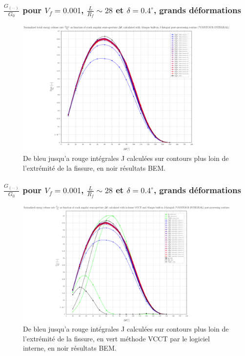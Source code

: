 \documentclass[first,firstsupp,lastsupp,handout,last,hyperref,table]{ETHclass}
\begin{document}
\begin{frame}
\frametitle{\small $\frac{G_{\left(\cdot\cdot\right)}}{G_{0}}$ pour $V_{f}=0.001$, $\frac{L}{R_{f}}\sim28$ et $\delta=0.4^{\circ}$, grands d\'eformations}
\vspace{-0.5cm}
\centering
\captionsetup[figure]{font=scriptsize,labelfont=scriptsize}
\begin{figure}[!h]
\centering
\includegraphics[height=0.7\textheight]{2017-06-23_AbqRunSummary_SingleFiberEqRfFiniteStrain_J-INT_Summary.pdf}
  \caption{\scriptsize De bleu jusqu'a rouge int\'egrales J calcul\'ees sur contours plus loin de l'extr\'emit\'e de la fissure, en noir r\'esultats BEM.}
  \label{fig:res1}
\end{figure}
\end{frame}

\begin{frame}
\frametitle{\small $\frac{G_{\left(\cdot\cdot\right)}}{G_{0}}$ pour $V_{f}=0.001$, $\frac{L}{R_{f}}\sim28$ et $\delta=0.4^{\circ}$, grands d\'eformations}
\vspace{-0.5cm}
\centering
\captionsetup[figure]{font=scriptsize,labelfont=scriptsize}
\begin{figure}[!h]
\centering
\includegraphics[height=0.7\textheight]{2017-06-23_AbqRunSummary_SingleFiberEqRfFiniteStrain_VCCT-JINT_Summary.pdf}
  \caption{\scriptsize De bleu jusqu'a rouge int\'egrales J calcul\'ees sur contours plus loin de l'extr\'emit\'e de la fissure, en vert m\'ethode VCCT par le logiciel interne, en noir r\'esultats BEM.}
  \label{fig:res1}
\end{figure}
\end{frame}
\end{document}
